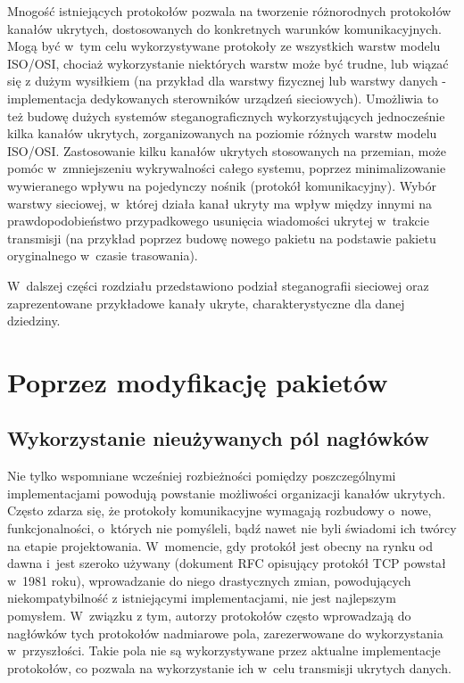 \documentclass[a4paper, twoside, 12pt]{report}
\begin{document}
    Mnogość istniejących protokołów pozwala na tworzenie różnorodnych protokołów
    kanałów ukrytych, dostosowanych do konkretnych warunków komunikacyjnych.
    Mogą być w~tym celu wykorzystywane protokoły ze wszystkich warstw modelu
    ISO/OSI, chociaż wykorzystanie niektórych warstw może być trudne, lub wiązać
    się z dużym wysiłkiem (na przykład dla warstwy fizycznej lub warstwy danych -
    implementacja dedykowanych sterowników urządzeń sieciowych). Umożliwia to
    też budowę dużych systemów steganograficznych wykorzystujących jednocześnie
    kilka kanałów ukrytych, zorganizowanych na poziomie różnych warstw modelu ISO/OSI.
    Zastosowanie kilku kanałów ukrytych stosowanych na przemian, może pomóc w~zmniejszeniu
    wykrywalności całego systemu, poprzez minimalizowanie wywieranego wpływu na pojedynczy
    nośnik (protokół komunikacyjny). Wybór warstwy sieciowej, w~której działa kanał ukryty
    ma wpływ między innymi na prawdopodobieństwo przypadkowego usunięcia wiadomości
    ukrytej w~trakcie transmisji (na przykład poprzez budowę nowego pakietu na podstawie
    pakietu oryginalnego w~czasie trasowania).

    W~dalszej części rozdziału przedstawiono podział steganografii sieciowej
    oraz zaprezentowane przykładowe kanały ukryte, charakterystyczne dla danej
    dziedziny.
    \section{Poprzez modyfikację pakietów} \label{MODYFIKACJAPAKIETOW}
        \subsection{Wykorzystanie nieużywanych pól nagłówków}
        Nie tylko wspomniane wcześniej rozbieżności pomiędzy poszczególnymi
        implementacjami powodują powstanie możliwości organizacji kanałów ukrytych.
        Często zdarza się, że protokoły komunikacyjne wymagają rozbudowy o~nowe,
        funkcjonalności, o~których nie pomyśleli, bądź nawet nie byli świadomi
        ich twórcy na etapie projektowania. W~momencie, gdy protokół jest obecny
        na rynku od dawna i~jest szeroko używany (dokument RFC opisujący protokół TCP
        powstał w~1981 roku\cite{TCPRFC}), wprowadzanie do niego drastycznych zmian,
        powodujących niekompatybilność z istniejącymi implementacjami, nie jest
        najlepszym pomysłem. W~związku z tym, autorzy protokołów często wprowadzają
        do nagłówków tych protokołów nadmiarowe pola, zarezerwowane do wykorzystania
        w~przyszłości. Takie pola nie są wykorzystywane przez aktualne implementacje
        protokołów, co pozwala na wykorzystanie ich w~celu transmisji ukrytych danych.
\end{document}
